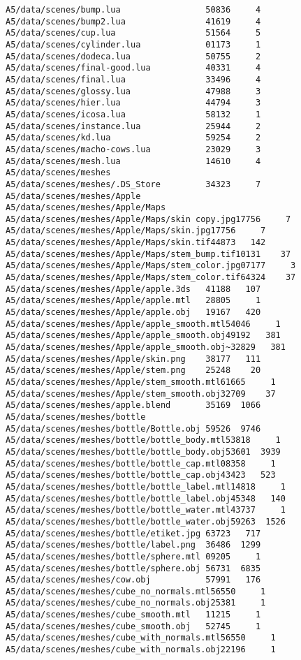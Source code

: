 \documentclass[12pt]{article}
\begin{document}
\begin{verbatim}
A5/data/scenes/bump.lua                 50836     4
A5/data/scenes/bump2.lua                41619     4
A5/data/scenes/cup.lua                  51564     5
A5/data/scenes/cylinder.lua             01173     1
A5/data/scenes/dodeca.lua               50755     2
A5/data/scenes/final-good.lua           40331     4
A5/data/scenes/final.lua                33496     4
A5/data/scenes/glossy.lua               47988     3
A5/data/scenes/hier.lua                 44794     3
A5/data/scenes/icosa.lua                58132     1
A5/data/scenes/instance.lua             25944     2
A5/data/scenes/kd.lua                   59254     2
A5/data/scenes/macho-cows.lua           23029     3
A5/data/scenes/mesh.lua                 14610     4
A5/data/scenes/meshes                   
A5/data/scenes/meshes/.DS_Store         34323     7
A5/data/scenes/meshes/Apple             
A5/data/scenes/meshes/Apple/Maps        
A5/data/scenes/meshes/Apple/Maps/skin copy.jpg17756     7
A5/data/scenes/meshes/Apple/Maps/skin.jpg17756     7
A5/data/scenes/meshes/Apple/Maps/skin.tif44873   142
A5/data/scenes/meshes/Apple/Maps/stem_bump.tif10131    37
A5/data/scenes/meshes/Apple/Maps/stem_color.jpg07177     3
A5/data/scenes/meshes/Apple/Maps/stem_color.tif64324    37
A5/data/scenes/meshes/Apple/apple.3ds   41188   107
A5/data/scenes/meshes/Apple/apple.mtl   28805     1
A5/data/scenes/meshes/Apple/apple.obj   19167   420
A5/data/scenes/meshes/Apple/apple_smooth.mtl54046     1
A5/data/scenes/meshes/Apple/apple_smooth.obj49192   381
A5/data/scenes/meshes/Apple/apple_smooth.obj~32829   381
A5/data/scenes/meshes/Apple/skin.png    38177   111
A5/data/scenes/meshes/Apple/stem.png    25248    20
A5/data/scenes/meshes/Apple/stem_smooth.mtl61665     1
A5/data/scenes/meshes/Apple/stem_smooth.obj32709    37
A5/data/scenes/meshes/apple.blend       35169  1066
A5/data/scenes/meshes/bottle            
A5/data/scenes/meshes/bottle/Bottle.obj 59526  9746
A5/data/scenes/meshes/bottle/bottle_body.mtl53818     1
A5/data/scenes/meshes/bottle/bottle_body.obj53601  3939
A5/data/scenes/meshes/bottle/bottle_cap.mtl08358     1
A5/data/scenes/meshes/bottle/bottle_cap.obj43423   523
A5/data/scenes/meshes/bottle/bottle_label.mtl14818     1
A5/data/scenes/meshes/bottle/bottle_label.obj45348   140
A5/data/scenes/meshes/bottle/bottle_water.mtl43737     1
A5/data/scenes/meshes/bottle/bottle_water.obj59263  1526
A5/data/scenes/meshes/bottle/etiket.jpg 63723   717
A5/data/scenes/meshes/bottle/label.png  36486  1299
A5/data/scenes/meshes/bottle/sphere.mtl 09205     1
A5/data/scenes/meshes/bottle/sphere.obj 56731  6835
A5/data/scenes/meshes/cow.obj           57991   176
A5/data/scenes/meshes/cube_no_normals.mtl56550     1
A5/data/scenes/meshes/cube_no_normals.obj25381     1
A5/data/scenes/meshes/cube_smooth.mtl   11215     1
A5/data/scenes/meshes/cube_smooth.obj   52745     1
A5/data/scenes/meshes/cube_with_normals.mtl56550     1
A5/data/scenes/meshes/cube_with_normals.obj22196     1


\end{verbatim}
\end{document}
